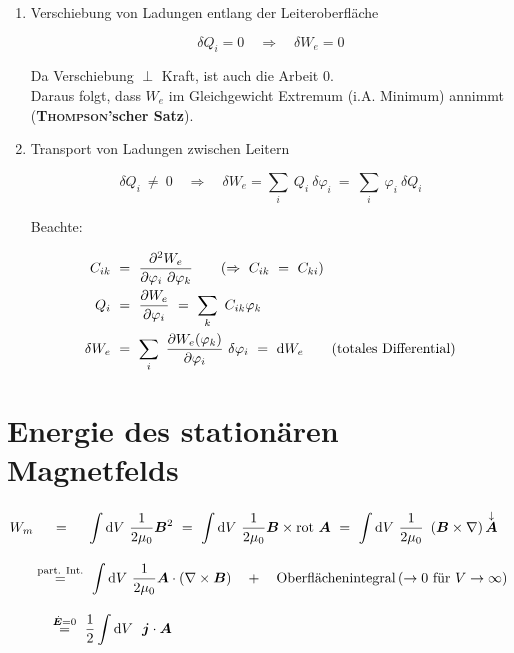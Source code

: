 \begin{enumerate}

\item Verschiebung von Ladungen entlang der Leiteroberfläche

\begin{equation*}
\delta Q_i = 0 \quad \Rightarrow \quad \delta W_e = 0
\end{equation*}

Da Verschiebung $\perp$ Kraft, ist auch die Arbeit 0.\\
Daraus folgt, dass $W_e$ im Gleichgewicht Extremum (i.A. Minimum) annimmt (\textbf{\textsc{Thompson}'scher Satz}).

\item Transport von Ladungen zwischen Leitern

\begin{equation*}
\delta Q_i \ \neq \ 0 \quad\Rightarrow\quad \delta W_e = \sum_i \ Q_i \ \delta\varphi_i \ = \ \sum_i \ \varphi_i \ \delta Q_i
\end{equation*} 

Beachte:

\begin{align*}
C_{ik} \ &= \ \frac{\partial^2 W_e}{\partial \varphi_i \ \partial\varphi_k} \qquad(\Rightarrow \ C_{ik} \ = \ C_{ki})\\
Q_i \ &= \ \pdiff{W_e}{\varphi_i} \ = \ \sum_k \ C_{ik} \varphi_k\\
\delta W_e \ &= \ \sum_i \ \pdiff{W_e(\varphi_k)}{\varphi_i} \ \delta\varphi_i \ = \ \d W_e \qquad (\text{totales Differential})
\end{align*}
\end{enumerate}

\section{Energie des stationären Magnetfelds}

\begin{align*}
W_m & \ \quad = \quad  \ \Int{}{}{V}\frac{1}{2\mu_0}\vec{B}^2 \ =  \ \Int{}{}{V} \frac{1}{2\mu_0} \vec{B}\times\rot\vec{A} \ = \ \Int{}{}{V} \frac{1}{2\mu_0} \ \left(\vec{B}\times\nabla\right) \overset{\downarrow}{\vec{A}}\\
& \overset{\text{part. Int.}}{=}  \  \Int{}{}{V} \frac{1}{2\mu_0} \vec{A} \cdot\left(\nabla\times\vec{B}\right) \quad + \quad \text{Oberflächenintegral} \left(\rightarrow 0 \text{ für } V \rightarrow \infty\right)\\
& \;\;\;\;\overset{\dot{\vec{E}}=0}{=} \ \frac{1}{2} \Int{}{}{V} \ \vec{j}\cdot\vec{A}
\end{align*}

